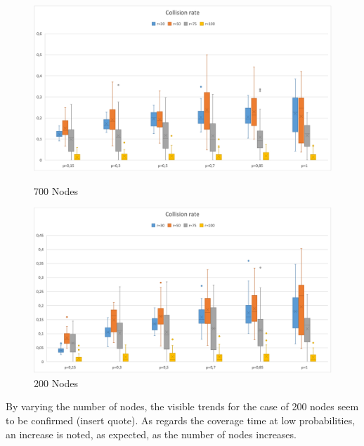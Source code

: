\begin{figure}[H]
  \includegraphics[width=\linewidth]{./images/Collision700Boxplot.png}
  \caption{700 Nodes}\label{fig:awesome_image1}
\endminipage\hfill
{}
  \includegraphics[width=\linewidth]{./images/Collision200Boxplot.png}
  \caption{200 Nodes}\label{fig:awesome_image2}
\endminipage
\end{figure}

By varying the number of nodes, the visible trends for the case of 200 nodes seem to be confirmed (insert quote). As regards the coverage time at low probabilities, an increase is noted, as expected, as the number of nodes increases.